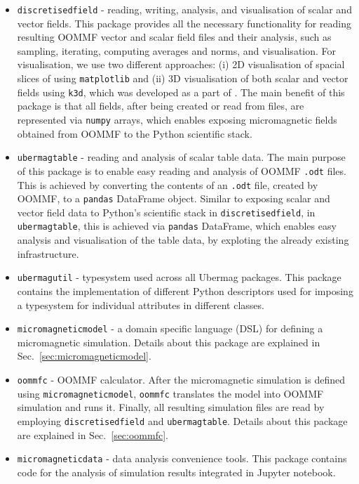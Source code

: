 \documentclass{deliverablereport}
\begin{document}
\begin{itemize}
\item \texttt{discretisedfield} - reading, writing, analysis, and visualisation of scalar and vector fields. This package provides all the necessary functionality for reading resulting OOMMF vector and scalar field files and their analysis, such as sampling, iterating, computing averages and norms, and visualisation. For visualisation, we use two different approaches: (i) 2D visualisation of spacial slices of using \texttt{matplotlib} and (ii) 3D visualisation of both scalar and vector fields using \texttt{k3d}, which was developed as a part of \ODK. The main benefit of this package is that all fields, after being created or read from files, are represented via \texttt{numpy} arrays, which enables exposing micromagnetic fields obtained from OOMMF to the Python scientific stack.
\item \texttt{ubermagtable} - reading and analysis of scalar table data. The main purpose of this package is to enable easy reading and analysis of OOMMF \texttt{.odt} files. This is achieved by converting the contents of an \texttt{.odt} file, created by OOMMF, to a \texttt{pandas} DataFrame object. Similar to exposing scalar and vector field data to Python's scientific stack in \texttt{discretisedfield}, in \texttt{ubermagtable}, this is achieved via \texttt{pandas} DataFrame, which enables easy analysis and visualisation of the table data, by exploting the already existing infrastructure.
\item \texttt{ubermagutil} - typesystem used across all Ubermag packages. This package contains the implementation of different Python descriptors used for imposing a typesystem for individual attributes in different classes.
\item \texttt{micromagneticmodel} - a domain specific language (DSL) for defining a micromagnetic simulation. Details about this package are explained in Sec.~\ref{sec:micromagneticmodel}.
\item \texttt{oommfc} - OOMMF calculator. After the micromagnetic simulation is defined using \texttt{micromagneticmodel}, \texttt{oommfc} translates the model into OOMMF simulation and runs it. Finally, all resulting simulation files are read by employing \texttt{discretisedfield} and \texttt{ubermagtable}. Details about this package are explained in Sec.~\ref{sec:oommfc}.
\item \texttt{micromagneticdata} - data analysis convenience tools. This package contains code for the analysis of simulation results integrated in Jupyter notebook.
\end{itemize}
\end{document}
